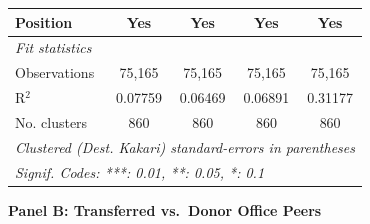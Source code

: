 \begin{table}[p]
\begin{threeparttable}
\begin{tabular}{lcccc}
   Position                       & Yes             & Yes                & Yes             & Yes\\  
   \midrule
   \emph{Fit statistics}\\
   Observations                   & 75,165          & 75,165             & 75,165          & 75,165\\  
   R$^2$                          & 0.07759         & 0.06469            & 0.06891         & 0.31177\\  
   No. clusters & 860             & 860                & 860             & 860\\  
   \midrule \midrule
   \multicolumn{5}{l}{\emph{Clustered (Dest. Kakari) standard-errors in parentheses}}\\
   \multicolumn{5}{l}{\emph{Signif. Codes: ***: 0.01, **: 0.05, *: 0.1}}\\
\end{tabular}

\medskip

\textbf{Panel B: Transferred vs.\ Donor Office Peers}
\smallskip


\end{threeparttable}
\end{table}
